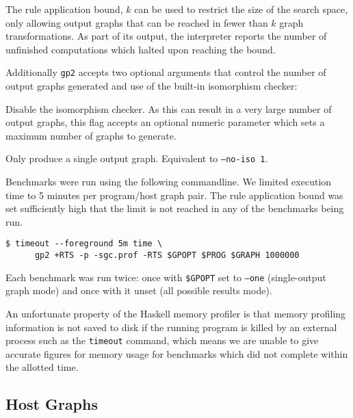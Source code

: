 The rule application bound, $k$ can be used to restrict the size of the search space, only allowing output graphs that can be reached in fewer than $k$ graph transformations. As part of its output, the interpreter reports the number of unfinished computations which halted upon reaching the bound.


Additionally \texttt{gp2} accepts two optional arguments that control the number of output graphs generated and use of the built-in isomorphism checker:

\begin{description}
	\setlength\itemsep{-0.2em}
	\item[\texttt{--no-iso} \textit{[n]}]  Disable the isomorphism checker. As this can result in a very large number of output graphs, this flag accepts an optional numeric parameter which sets a maximum number of graphs to generate.

	\item[\texttt{--one}] Only produce a single output graph. Equivalent to \texttt{--no-iso 1}.
\end{description}

Benchmarks were run using the following commandline. We limited execution time to 5 minutes per program/host graph pair. The rule application bound was set sufficiently high that the limit is not reached in any of the benchmarks being run.

\begin{verbatim}
$ timeout --foreground 5m time \
      gp2 +RTS -p -sgc.prof -RTS $GPOPT $PROG $GRAPH 1000000
\end{verbatim}

Each benchmark was run twice: once with \texttt{\$GPOPT} set to \texttt{--one} (single-output graph mode) and once with it unset (all possible results mode).

An unfortunate property of the Haskell memory profiler is that memory profiling information is not saved to disk if the running program is killed by an external process such as the \texttt{timeout} command, which means we are unable to give accurate figures for memory usage for benchmarks which did not complete within the allotted time.


\subsection{Host Graphs}
\label{subsec:hosts}

